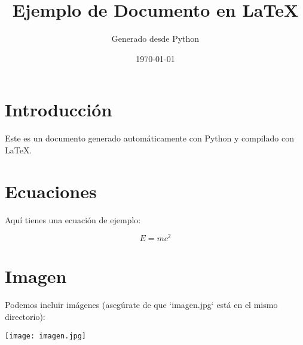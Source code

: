 \documentclass{article}
\begin{document}
\title{Ejemplo de Documento en \LaTeX}
\author{Generado desde Python}
\date{\today}

\maketitle

\section{Introducción}
Este es un documento generado automáticamente con Python y compilado con \LaTeX.

\section{Ecuaciones}
Aquí tienes una ecuación de ejemplo:

\[
E = mc^2
\]

\section{Imagen}
Podemos incluir imágenes (asegúrate de que `imagen.jpg` está en el mismo directorio):

\texttt{[image: imagen.jpg]}
\end{document}

